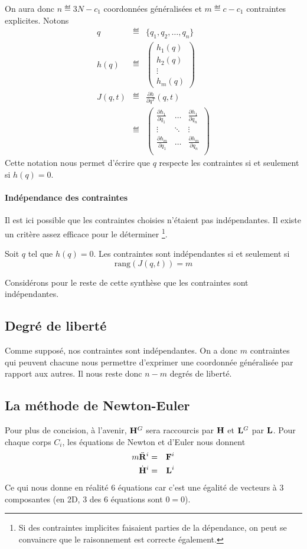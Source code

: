 On aura donc $n \eqdef 3N - c_1$ coordonnées généralisées et $m \eqdef c - c_1$ contraintes explicites.
Notons
\begin{eqnarray*}
  q & \eqdef & \{q_1, q_2, \ldots, q_n\}\\
h(q) & \eqdef & \begin{pmatrix}h_1(q)\\h_2(q)\\\vdots\\h_m(q)\end{pmatrix}\\
  J(q, t) & \eqdef & \frac{\partial h}{\partial q^T}(q, t)\\
          & \eqdef &
  \begin{pmatrix}
    \frac{\partial h_1}{\partial q_1} & \ldots & \frac{\partial h_1}{\partial q_n}\\
    \vdots & \ddots & \vdots\\
    \frac{\partial h_m}{\partial q_1} & \ldots & \frac{\partial h_m}{\partial q_n}\\
  \end{pmatrix}
\end{eqnarray*}
Cette notation nous permet d'écrire que $q$ respecte les contraintes si et seulement si $h(q) = 0$.

\paragraph{Indépendance des contraintes}
Il est ici possible que les contraintes choisies n'étaient pas indépendantes.
Il existe un critère assez efficace pour le déterminer
\footnote{Si des contraintes implicites faisaient parties de la dépendance, on peut se convaincre que le raisonnement est correcte également.}.

Soit $q$ tel que $h(q) = 0$.
Les contraintes sont indépendantes si et seulement si
\[ \mathrm{rang} (J(q, t)) = m \]

Considérons pour le reste de cette synthèse que les contraintes sont indépendantes.

\subsection{Degré de liberté}
Comme supposé, nos contraintes sont indépendantes.
On a donc $m$ contraintes qui peuvent chacune nous permettre d'exprimer une coordonnée généralisée par rapport aux autres.
Il nous reste donc $n - m$ degrés de liberté.

\subsection{La méthode de Newton-Euler}
Pour plus de concision, à l'avenir, ${\bf H}^G$ sera raccourcis par ${\bf H}$ et ${\bf L}^G$ par ${\bf L}$.
Pour chaque corps $C_i$, les équations de Newton et d'Euler nous donnent
\begin{eqnarray*}
  m\ddot{\bf R}^i &=& {\bf F}^i\\
  \dot{{\bf H}}^i &=& {\bf L}^i
\end{eqnarray*}
Ce qui nous donne en réalité 6 équations car c'est une égalité de vecteurs à 3 composantes (en 2D, 3 des 6 équations sont $0 = 0$).
